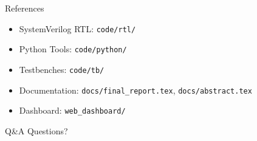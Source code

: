 \documentclass{beamer}
\begin{document}
\begin{frame}{References}
  \begin{itemize}
    \item SystemVerilog RTL: \texttt{code/rtl/}
    \item Python Tools: \texttt{code/python/}
    \item Testbenches: \texttt{code/tb/}
    \item Documentation: \texttt{docs/final\_report.tex}, \texttt{docs/abstract.tex}
    \item Dashboard: \texttt{web\_dashboard/}
  \end{itemize}
\end{frame}

\begin{frame}{Q\&A}
  \centering
  \Huge Questions?
\end{frame}
\end{document}
